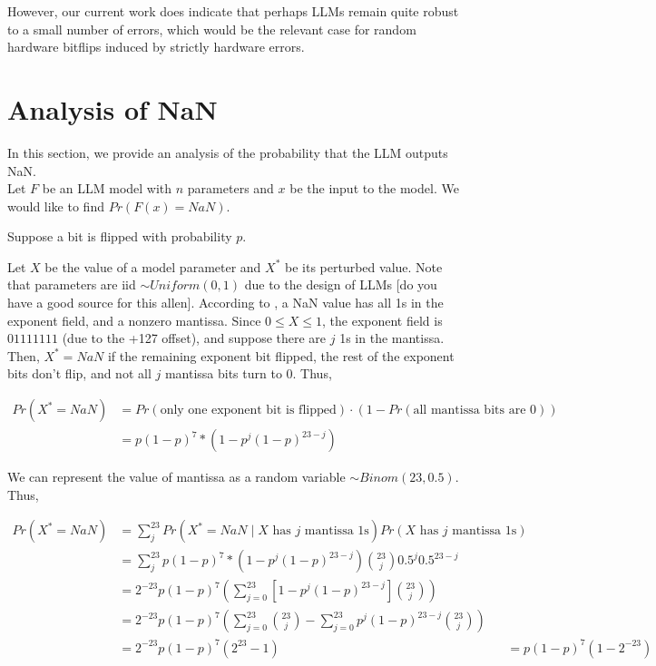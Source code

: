 \documentclass[a4paper]{article}
\begin{document}
However, our current work does indicate that perhaps LLMs remain quite robust to a small number of errors, which would be the relevant case for random hardware bitflips induced by strictly hardware errors.

\section{Analysis of NaN}
In this section, we provide an analysis of the probability that the LLM outputs NaN. \\

Let $F$ be an LLM model with $n$ parameters and $x$ be the input to the model. We would like to find $Pr(F(x) = NaN)$.

Suppose a bit is flipped with probability $p$.

Let $X$ be the value of a model parameter and $X^*$ be its perturbed value. Note that parameters are iid $\sim Uniform(0, 1)$ due to the design of LLMs [do you have a good source for this allen]. According to \cite{IEEE754}, a NaN value has all 1s in the exponent field, and a nonzero mantissa. Since $0 \le X \le 1$, the exponent field is $01111111$ (due to the +127 offset), and suppose there are $j$ 1s in the mantissa. \\

Then, $X^* = NaN$ if the remaining exponent bit flipped, the rest of the exponent bits don't flip, and not all $j$ mantissa bits turn to 0. Thus,

\begin{align*}
	Pr(X^* = NaN) &= Pr(\text{only one exponent bit is flipped}) \cdot (1 - Pr(\text{all mantissa bits are 0})) \\
	&= p(1 - p)^7 * (1 - p^j(1 - p)^{23 - j})
\end{align*}

We can represent the value of mantissa as a random variable $\sim Binom(23, 0.5)$. Thus,

\begin{align*}
	Pr(X^* = NaN) &= \sum_j^23 Pr(X^* = NaN \mid X \text{ has $j$ mantissa 1s})Pr(X\text{ has $j$ mantissa 1s}) \\
	&= \sum_j^23 p(1 - p)^7 * (1 - p^j(1 - p)^{23 - j})\binom{23}{j}0.5^j0.5^{23 - j} \\
	&= 2^{-23} p (1 - p)^7 \left(\sum_{j=0}^{23}[1 - p^j(1 - p)^{23 - j}] \binom{23}{j}\right) \\
	&= 2^{-23} p (1 - p)^7 \left(\sum_{j=0}^{23}\binom{23}{j} - \sum_{j=0}^{23}p^j(1 - p)^{23 - j} \binom{23}{j}\right) \\
	&= 2^{-23} p (1 - p)^7(2^23 - 1)
	&= p(1 - p)^7(1 - 2^{-23})
\end{align*}
\end{document}
